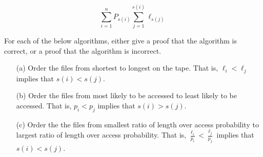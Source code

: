\documentclass[10pt]{article}
\begin{document}
	\[\sum\limits_{i=1}^n P_{s(i)} \sum\limits_{j=1}^{s(i)} \ell_{s(j)}\]
	
	For each of the below algorithms, either give a proof that the algorithm is correct, or a proof that the
	algorithm is incorrect.
	\begin{enumerate}
		\item[(a)] Order the files from shortest to longest on the tape. That is, $\ell_{i} < \ell_{j}$ implies that $s(i) < s(j)$.
		\item[(b)] Order the files from most likely to be accessed to least likely to be accessed.  That is, $p_{i} < p_{j}$
		implies that $s(i) > s(j)$.
		\item[(c)] Order the the files from smallest ratio of length over access probability to largest ratio of length
		over access probability. That is, $\frac{\ell_{i}}{p_{i}} < \frac{\ell_{j}}{p_{j}}$ implies that $s(i) < s(j)$.
	\end{enumerate}
\end{document}
